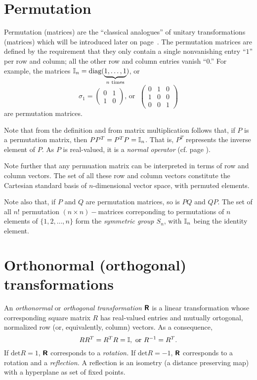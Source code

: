 \section{Permutation}

Permutation (matrices) are the ``classical analogues'' \cite{mermin-04,mermin-07}
of unitary transformations (matrices) which will be introduced later on page~\pageref{2014-m-ch-fdvs-unitary}.
The permutation matrices are defined by the requirement that they only contain a single nonvanishing entry ``$1$'' per row and column;
all the other row and column entries vanish ``$0$.''
For example, the matrices ${\Bbb I}_n=\textrm{diag}(\underbrace{1,\ldots ,1}_{n \textrm{ times}})$,
or
$$
\sigma_1=
\begin{pmatrix}
0&1\\
1&0
\end{pmatrix}
\textrm{, or }\;
\begin{pmatrix}
0&1&0\\
1&0&0\\
0&0&1
\end{pmatrix}
$$
are permutation matrices.

Note that from the definition and from matrix multiplication follows that,
if $P$ is a permutation matrix, then $PP^T=P^T P={\Bbb I}_n$.
That is, $P^T$ represents the inverse element of $P$.
As $P$ is real-valued, it is a {\em normal operator} (cf. page \pageref{2014-m-fdvs-normality}).


Note further that any permuation matrix can be interpreted in terms of row and column vectors.
The set of all these row and column vectors constitute the Cartesian standard basis of $n$-dimensional vector space,
with permuted elements.

Note also that, if $P$ and $Q$ are permutation matrices, so is $PQ$ and $QP$.
The set of all $n!$
permutation $(n\times n)-$matrices correponding to permutations of $n$ elements of $\{ 1,2,\ldots ,n\}$ form the
{\em symmetric group $S_n$}, with ${\Bbb I}_n$ being the identity element.


\section{Orthonormal (orthogonal) transformations}
\label{2015-m-ch-fdlvs-orthproj}

An {\em orthonormal} or {\em orthogonal transformation} $\textsf{\textbf{R}}$ is a linear transformation
whose corresponding square matrix $R$ has real-valued entries
and mutually ortogonal, normalized row (or, equivalently, column) vectors.
As a consequence,
\begin{equation}
RR^T= R^TR= {\Bbb I}, \textrm{ or } R^{-1}=R^T .
\end{equation}
If $\textrm{det} R=1$, $\textsf{\textbf{R}}$ corresponds to a {\em rotation.}
If $\textrm{det} R=-1$, $\textsf{\textbf{R}}$ corresponds to a rotation and a {\em reflection.}
A reflection is an isometry (a distance preserving map) with a hyperplane as set of fixed points.

